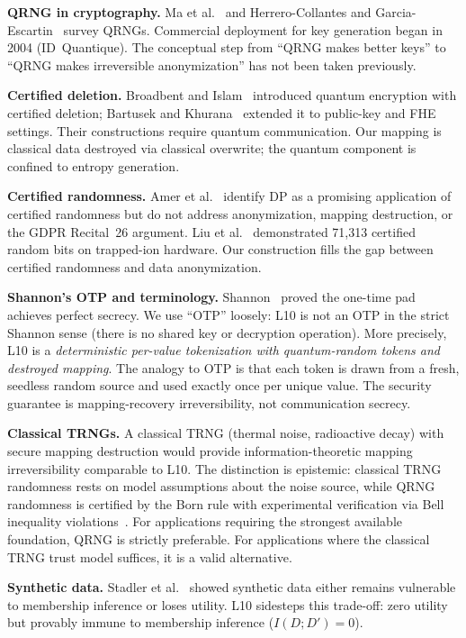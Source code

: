 \documentclass[acmsmall,screen,review,anonymous]{acmart}
\begin{document}
\textbf{QRNG in cryptography.} Ma et al.~\cite{ma2016qrng} and Herrero-Collantes and Garcia-Escartin~\cite{herrero2017qrng} survey QRNGs. Commercial deployment for key generation began in 2004 (ID~Quantique). The conceptual step from ``QRNG makes better keys'' to ``QRNG makes irreversible anonymization'' has not been taken previously.

\textbf{Certified deletion.} Broadbent and Islam~\cite{broadbent2020certified} introduced quantum encryption with certified deletion; Bartusek and Khurana~\cite{bartusek2023certified} extended it to public-key and FHE settings. Their constructions require quantum communication. Our mapping is classical data destroyed via classical overwrite; the quantum component is confined to entropy generation.

\textbf{Certified randomness.} Amer et al.~\cite{amer2025certified} identify DP as a promising application of certified randomness but do not address anonymization, mapping destruction, or the GDPR Recital~26 argument. Liu et al.~\cite{liu2025certified} demonstrated 71,313 certified random bits on trapped-ion hardware. Our construction fills the gap between certified randomness and data anonymization.

\textbf{Shannon's OTP and terminology.} Shannon~\cite{shannon1949secrecy} proved the one-time pad achieves perfect secrecy. We use ``OTP'' loosely: L10 is not an OTP in the strict Shannon sense (there is no shared key or decryption operation). More precisely, L10 is a \emph{deterministic per-value tokenization with quantum-random tokens and destroyed mapping}. The analogy to OTP is that each token is drawn from a fresh, seedless random source and used exactly once per unique value. The security guarantee is mapping-recovery irreversibility, not communication secrecy.

\textbf{Classical TRNGs.} A classical TRNG (thermal noise, radioactive decay) with secure mapping destruction would provide information-theoretic mapping irreversibility comparable to L10. The distinction is epistemic: classical TRNG randomness rests on model assumptions about the noise source, while QRNG randomness is certified by the Born rule with experimental verification via Bell inequality violations~\cite{hensen2015loophole}. For applications requiring the strongest available foundation, QRNG is strictly preferable. For applications where the classical TRNG trust model suffices, it is a valid alternative.

\textbf{Synthetic data.} Stadler et al.~\cite{stadler2022synthetic} showed synthetic data either remains vulnerable to membership inference or loses utility. L10 sidesteps this trade-off: zero utility but provably immune to membership inference ($I(D;D')=0$).
\end{document}
